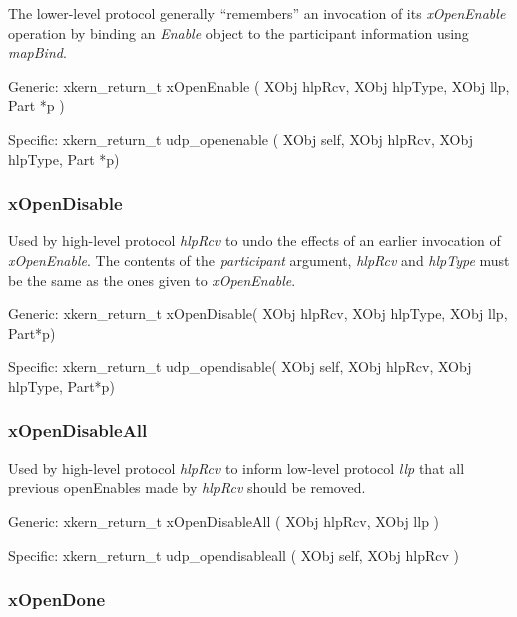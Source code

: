 The lower-level protocol generally ``remembers'' an invocation of its
{\em xOpenEnable} operation by binding an {\em Enable} object to the
participant information using {\em mapBind}.
\medskip

{\sanss Generic:} {\sem xkern\_return\_t} {\bold xOpenEnable} (
{\sem XObj} {\caps hlpRcv}, {\sem XObj} {\caps hlpType}, 
{\sem XObj} {\caps llp}, {\sem Part} *{\caps p}
)
\medskip

{\sanss Specific:} {\sem xkern\_return\_t} {\bold udp\_openenable} (
{\sem XObj} {\caps self}, 
{\sem XObj} {\caps hlpRcv}, {\sem XObj} {\caps hlpType}, 
{\sem Part} *{\caps p})

\subsubsection{xOpenDisable}

\noindent Used by high-level protocol {\em hlpRcv} to undo the effects
of an earlier invocation of {\em xOpenEnable}. The contents of the
{\em participant} argument, { \em hlpRcv } and { \em hlpType } must be
the same as the ones given to {\em xOpenEnable}.\medskip

{\sanss Generic:} {\sem xkern\_return\_t} {\bold xOpenDisable}(
{\sem XObj} {\caps hlpRcv}, {\sem XObj} {\caps hlpType}, 
{\sem XObj} {\caps  llp}, {\sem Part}*{\caps p})
\medskip

{\sanss Specific:} {\sem xkern\_return\_t} {\bold udp\_opendisable}(
{\sem XObj} {\caps self}, 
{\sem XObj} {\caps hlpRcv}, {\sem XObj} {\caps hlpType}, 
{\sem Part}*{\caps p})


\subsubsection{xOpenDisableAll}

\noindent 
Used by high-level protocol {\em hlpRcv} to 
inform low-level protocol {\em llp} that all previous
openEnables made by {\em hlpRcv} should be removed.  

\medskip

{\sanss Generic:} {\sem xkern\_return\_t} {\bold xOpenDisableAll}
( {\sem XObj} {\caps hlpRcv}, {\sem XObj} {\caps  llp} )
\medskip

{\sanss Specific:} {\sem xkern\_return\_t} {\bold udp\_opendisableall}
( {\sem XObj} {\caps self}, {\sem XObj} {\caps hlpRcv} )


\subsubsection{xOpenDone}

